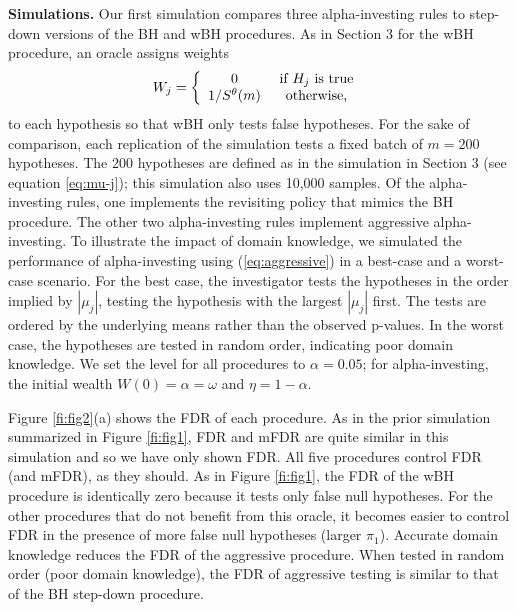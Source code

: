 \documentclass[12pt]{article}
\newcommand{\al}{\alpha}
\newcommand{\eqn}[1]{(\ref{#1})}
\begin{document}
 \vspace{0.1in} {\noindent}{\bf Simulations.} Our first simulation
 compares three alpha-investing rules to step-down versions of the BH
 and wBH procedures. As in Section 3 for the wBH procedure, an oracle
 assigns weights
\begin{displaymath}
    W_j = \left\{ \begin{array}{cc}
                   0                     & \mbox{ if } H_j \mbox{ is true } \cr
                   1/S^\theta(m) & \mbox{ otherwise, }
               \end{array} \right.
\end{displaymath}
to each hypothesis so that wBH only tests false hypotheses. For the
 sake of comparison, each replication of the simulation tests a fixed
 batch of $m = 200$ hypotheses.  The 200 hypotheses are defined as in
 the simulation in Section 3 (see equation \ref{eq:mu-j}); this
 simulation also uses 10,000 samples. Of the alpha-investing rules,
 one implements the revisiting policy that mimics the BH procedure.
  The other two alpha-investing rules implement aggressive
 alpha-investing. To illustrate the impact of domain knowledge, we
 simulated the performance of alpha-investing using
 \eqn{eq:aggressive} in a best-case and a worst-case scenario.  For
 the best case, the investigator tests the hypotheses in the order
 implied by $|\mu_j|$, testing the hypothesis with the largest
 $|\mu_j|$ first. The tests are ordered by the underlying means rather
 than the observed p-values.  In the worst case, the hypotheses are
 tested in random order, indicating poor domain knowledge. We set the
 level for all procedures to $\al = 0.05$; for alpha-investing, the
 initial wealth $W(0) = \alpha = \omega$ and $\eta= 1-\alpha$.
 
Figure \ref{fi:fig2}(a) shows the FDR of each procedure. As in the
 prior simulation summarized in Figure \ref{fi:fig1}, FDR and mFDR are
 quite similar in this simulation and so we have only shown FDR.  All
 five procedures control FDR (and mFDR), as they should. As in Figure
 \ref{fi:fig1}, the FDR of the wBH procedure is identically zero
 because it tests only false null hypotheses. For the other procedures
 that do not benefit from this oracle, it becomes easier to control
 FDR in the presence of more false null hypotheses (larger
 $\pi_1$). Accurate domain knowledge reduces the FDR of the aggressive
 procedure. When tested in random order (poor domain knowledge), the
 FDR of aggressive testing is similar to that of the BH step-down
 procedure.
 
\end{document}

